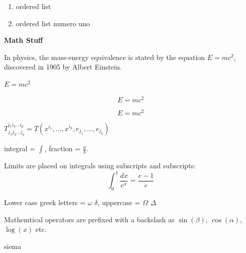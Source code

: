 \documentclass[12pt, a4paper]{article} %
\begin{document}
\begin{enumerate}
	\item ordered list
	\item ordered list numero uno
\end{enumerate}

\textbf{Math Stuff}

In physics, the mass-energy equivalence is stated by the equation $E=mc^2$, discovered in 1905 by Albert Einstein.

\begin{math}
	E=mc^2	
\end{math}

\[E=mc^2\] 

\begin{equation}
	E=mc^2
\end{equation}

\begin{math}
	T^{i_1 i_2 \dots i_p}_{j_1 j_2 \dots j_q} = T(x^{i_1}, \dots, x^{i_p}, e_{j_1}, \dots, e_{j_q})
\end{math}

\vspace{5mm}

integral = $\int$, fraction = $\frac{a}{b}$.

Limits are placed on integrals using subscripts and subscripts:
\[ \int_0^1 \frac{dx}{e^x} = \frac{e-1}{e}\]

Lower case greek letters = $\omega$ $\delta$, uppercase = $\Omega$ $\Delta$

Mathemtical operators are prefixed with a backslash as $\sin(\beta)$, $\cos(\alpha)$, $\log(x)$ etc.

siema
\end{document}
